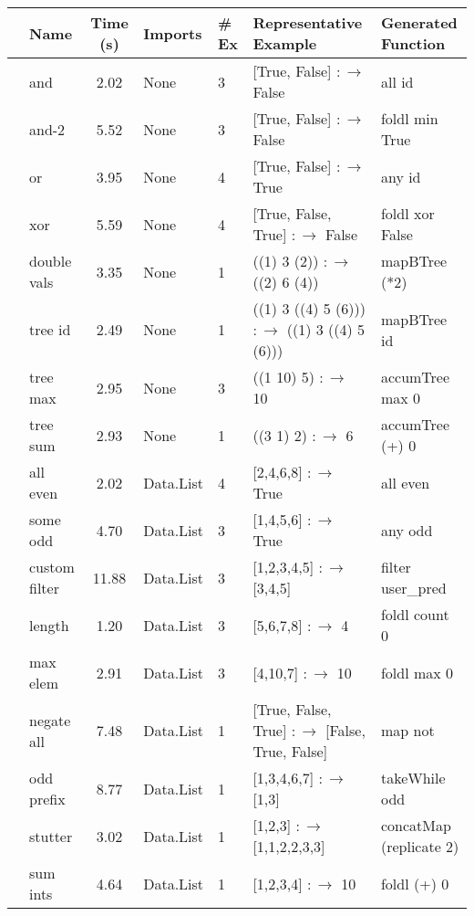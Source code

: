 \begin{table*}[t]
  \centering
  \bgroup
  \def\arraystretch{1.1}
  \begin{tabular}{|c|l|c|l|l|l|l|}
    \hline
    & Name & Time (s) & Imports & \# Ex & Representative Example & Generated Function \\
    \hline
    \parbox[t]{2mm}{}
    & and & 2.02 & None & 3 & [True, False] $:\to$ False & all id \\
    & and-2 & 5.52 & None & 3 & [True, False] $:\to$ False & foldl min True \\
    & or  & 3.95 & None & 4 & [True, False] $:\to$ True & any id \\
    & xor & 5.59 & None & 4 & [True, False, True] $:\to$ False & foldl xor False \\
    \hline
    
    \parbox[t]{2mm}{}
    & double vals & 3.35 & None & 1 & ((1) 3 (2)) $:\to$ ((2) 6 (4)) & mapBTree (*2) \\
    & tree id & 2.49 & None & 1 & ((1) 3 ((4) 5 (6))) $:\to$ ((1) 3 ((4) 5 (6))) & mapBTree id \\
    & tree max & 2.95 & None & 3 & ((1 10) 5) $:\to$ 10 & accumTree max 0 \\
    & tree sum & 2.93 & None & 1 & ((3 1) 2) $:\to$ 6 & accumTree (+) 0 \\
    \hline
    
    \parbox[t]{2mm}{}
    & all even & 2.02 & Data.List & 4 & [2,4,6,8] $:\to$ True & all even \\
    & some odd & 4.70 & Data.List & 3 & [1,4,5,6] $:\to$ True & any odd \\
    & custom filter & 11.88 & Data.List & 3 & [1,2,3,4,5] $:\to$ [3,4,5] & filter user\_pred \\
    & length & 1.20 & Data.List & 3 & [5,6,7,8] $:\to$ 4 & foldl count 0 \\
    & max elem & 2.91 & Data.List & 3 & [4,10,7] $:\to$ 10 & foldl max 0 \\
    & negate all & 7.48 & Data.List & 1 & [True, False, True] $:\to$ [False, True, False] & map not \\
    & odd prefix & 8.77 & Data.List & 1 & [1,3,4,6,7] $:\to$ [1,3] & takeWhile odd \\
    & stutter & 3.02 & Data.List & 1 & [1,2,3] $:\to$ [1,1,2,2,3,3] & concatMap (replicate 2) \\
    & sum ints & 4.64 & Data.List & 1 & [1,2,3,4] $:\to$ 10 & foldl (+) 0 \\
    \hline
    

\end{tabular}
\end{table*}

